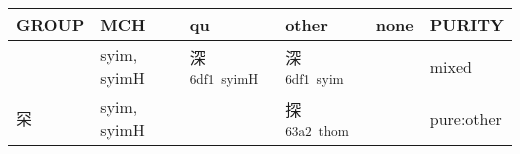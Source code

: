 \documentclass[14pt,a4paper]{scrartcl}
\begin{document}
\begin{longtable}[c]{@{}llllll@{}}
\toprule
\begin{minipage}[b]{0.14\columnwidth}\raggedright\strut
GROUP
\strut\end{minipage} &
\begin{minipage}[b]{0.14\columnwidth}\raggedright\strut
MCH
\strut\end{minipage} &
\begin{minipage}[b]{0.14\columnwidth}\raggedright\strut
qu
\strut\end{minipage} &
\begin{minipage}[b]{0.14\columnwidth}\raggedright\strut
other
\strut\end{minipage} &
\begin{minipage}[b]{0.14\columnwidth}\raggedright\strut
none
\strut\end{minipage} &
\begin{minipage}[b]{0.14\columnwidth}\raggedright\strut
PURITY
\strut\end{minipage}\tabularnewline
\midrule
\endhead
\begin{minipage}[t]{0.14\columnwidth}\raggedright\strut
𥥍
\strut\end{minipage} &
\begin{minipage}[t]{0.14\columnwidth}\raggedright\strut
syim, syimH
\strut\end{minipage} &
\begin{minipage}[t]{0.14\columnwidth}\raggedright\strut
深\textsuperscript{6df1~syimH}
\strut\end{minipage} &
\begin{minipage}[t]{0.14\columnwidth}\raggedright\strut
深\textsuperscript{6df1~syim}
\strut\end{minipage} &
\begin{minipage}[t]{0.14\columnwidth}\raggedright\strut
\strut\end{minipage} &
\begin{minipage}[t]{0.14\columnwidth}\raggedright\strut
mixed
\strut\end{minipage}\tabularnewline
\begin{minipage}[t]{0.14\columnwidth}\raggedright\strut
罙
\strut\end{minipage} &
\begin{minipage}[t]{0.14\columnwidth}\raggedright\strut
syim, syimH
\strut\end{minipage} &
\begin{minipage}[t]{0.14\columnwidth}\raggedright\strut
\strut\end{minipage} &
\begin{minipage}[t]{0.14\columnwidth}\raggedright\strut
探\textsuperscript{63a2~thom}
\strut\end{minipage} &
\begin{minipage}[t]{0.14\columnwidth}\raggedright\strut
\strut\end{minipage} &
\begin{minipage}[t]{0.14\columnwidth}\raggedright\strut
pure:other
\strut\end{minipage}\tabularnewline
\bottomrule
\end{longtable}
\end{document}
